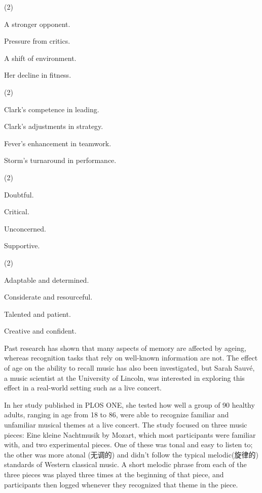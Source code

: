 \documentclass{英语试卷}
\begin{document}
\begin{choices}(2)
  \item A stronger opponent.
  \item Pressure from critics.
  \item A shift of environment.
  \item Her decline in fitness.
\end{choices}
\begin{choices}(2)
  \item Clark's competence in leading.
  \item Clark's adjustments in strategy.
  \item Fever's enhancement in teamwork.
  \item Storm's turnaround in performance.
\end{choices}
\begin{choices}(2)
  \item Doubtful.
  \item Critical.
  \item Unconcerned.
  \item Supportive.
\end{choices}
\begin{choices}(2)
  \item Adaptable and determined.
  \item Considerate and resourceful.
  \item Talented and patient.
  \item Creative and confident.
\end{choices}
\par Past research has shown that many aspects of memory are affected by ageing, whereas recognition tasks that rely on well-known information are not. The effect of age on the ability to recall music has also been investigated, but Sarah Sauvé, a music scientist at the University of Lincoln, was interested in exploring this effect in a real-world setting such as a live concert.\par
\par In her study published in PLOS ONE, she tested how well a group of 90 healthy adults, ranging in age from 18 to 86, were able to recognize familiar and unfamiliar musical themes at a live concert. The study focused on three music pieces: Eine kleine Nachtmusik by Mozart, which most participants were familiar with, and two experimental pieces. One of these was tonal and easy to listen to; the other was more atonal (无调的) and didn't follow the typical melodic(旋律的) standards of Western classical music. A short melodic phrase from each of the three pieces was played three times at the beginning of that piece, and participants then logged whenever they recognized that theme in the piece.\par
\end{document}
